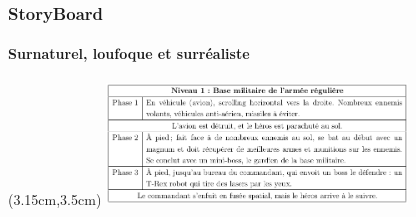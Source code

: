\begin{frame}
	\frametitle{StoryBoard}
	\framesubtitle{Surnaturel, loufoque et surréaliste}
	\begin{textblock*}{8cm}(3.15cm,3.5cm)
		\includegraphics[width=8cm]{figures/storyboard.png}
	\end{textblock*}
\end{frame}

